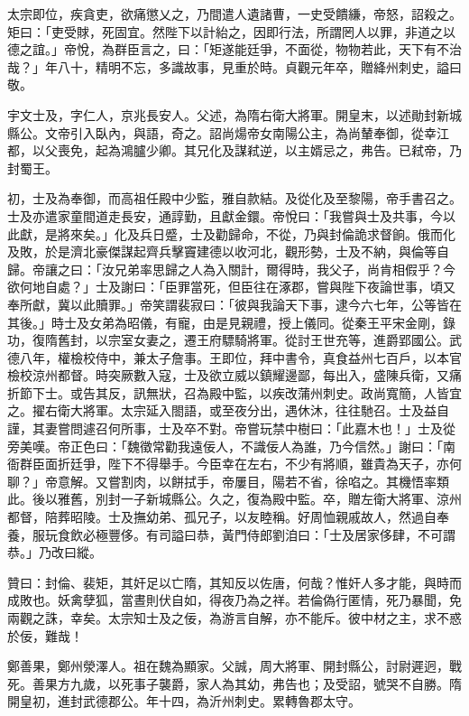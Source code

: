 \begin{pinyinscope}
 太宗即位，疾貪吏，欲痛懲乂之，乃間遣人遺諸曹，一史受饋縑，帝怒，詔殺之。矩曰：「吏受賕，死固宜。然陛下以計紿之，因即行法，所謂罔人以罪，非道之以德之誼。」帝悅，為群臣言之，曰：「矩遂能廷爭，不面從，物物若此，天下有不治哉？」年八十，精明不忘，多識故事，見重於時。貞觀元年卒，贈絳州刺史，謚曰敬。



 宇文士及，字仁人，京兆長安人。父述，為隋右衛大將軍。開皇末，以述勛封新城縣公。文帝引入臥內，與語，奇之。詔尚煬帝女南陽公主，為尚輦奉御，從幸江都，以父喪免，起為鴻臚少卿。其兄化及謀弒逆，以主婿忌之，弗告。已弒帝，乃封蜀王。



 初，士及為奉御，而高祖任殿中少監，雅自款結。及從化及至黎陽，帝手書召之。士及亦遣家童間道走長安，通諄勤，且獻金鐶。帝悅曰：「我嘗與士及共事，今以此獻，是將來矣。」化及兵日蹙，士及勸歸命，不從，乃與封倫詭求督餉。俄而化及敗，於是濟北豪傑謀起齊兵擊竇建德以收河北，觀形勢，士及不納，與倫等自歸。帝讓之曰：「汝兄弟率思歸之人為入關計，爾得時，我父子，尚肯相假乎？今欲何地自處？」士及謝曰：「臣罪當死，但臣往在涿郡，嘗與陛下夜論世事，頃又奉所獻，冀以此贖罪。」帝笑謂裴寂曰：「彼與我論天下事，逮今六七年，公等皆在其後。」時士及女弟為昭儀，有寵，由是見親禮，授上儀同。從秦王平宋金剛，錄功，復隋舊封，以宗室女妻之，遷王府驃騎將軍。從討王世充等，進爵郢國公。武德八年，權檢校侍中，兼太子詹事。王即位，拜中書令，真食益州七百戶，以本官檢校涼州都督。時突厥數入寇，士及欲立威以鎮耀邊鄙，每出入，盛陳兵衛，又痛折節下士。或告其反，訊無狀，召為殿中監，以疾改蒲州刺史。政尚寬簡，人皆宜之。擢右衛大將軍。太宗延入閤語，或至夜分出，遇休沐，往往馳召。士及益自謹，其妻嘗問遽召何所事，士及卒不對。帝嘗玩禁中樹曰：「此嘉木也！」士及從旁美嘆。帝正色曰：「魏徵常勸我遠佞人，不識佞人為誰，乃今信然。」謝曰：「南衙群臣面折廷爭，陛下不得舉手。今臣幸在左右，不少有將順，雖貴為天子，亦何聊？」帝意解。又嘗割肉，以餅拭手，帝屢目，陽若不省，徐啗之。其機悟率類此。後以雅舊，別封一子新城縣公。久之，復為殿中監。卒，贈左衛大將軍、涼州都督，陪葬昭陵。士及撫幼弟、孤兄子，以友睦稱。好周恤親戚故人，然過自奉養，服玩食飲必極豐侈。有司謚曰恭，黃門侍郎劉洎曰：「士及居家侈肆，不可謂恭。」乃改曰縱。



 贊曰：封倫、裴矩，其奸足以亡隋，其知反以佐唐，何哉？惟奸人多才能，與時而成敗也。妖禽孽狐，當晝則伏自如，得夜乃為之祥。若倫偽行匿情，死乃暴聞，免兩觀之誅，幸矣。太宗知士及之佞，為游言自解，亦不能斥。彼中材之主，求不惑於佞，難哉！



 鄭善果，鄭州滎澤人。祖在魏為顯家。父誠，周大將軍、開封縣公，討尉遲迥，戰死。善果方九歲，以死事子襲爵，家人為其幼，弗告也；及受詔，號哭不自勝。隋開皇初，進封武德郡公。年十四，為沂州刺史。累轉魯郡太守。




\end{pinyinscope}
